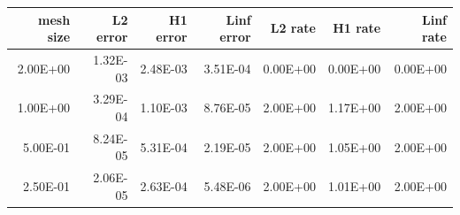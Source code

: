 \begin{tabular}{rrrrrrr}
\toprule
mesh size & L2 error & H1 error & Linf error & L2 rate & H1 rate & Linf rate \\
\midrule
2.00E+00 & 1.32E-03 & 2.48E-03 & 3.51E-04 & 0.00E+00 & 0.00E+00 & 0.00E+00 \\
1.00E+00 & 3.29E-04 & 1.10E-03 & 8.76E-05 & 2.00E+00 & 1.17E+00 & 2.00E+00 \\
5.00E-01 & 8.24E-05 & 5.31E-04 & 2.19E-05 & 2.00E+00 & 1.05E+00 & 2.00E+00 \\
2.50E-01 & 2.06E-05 & 2.63E-04 & 5.48E-06 & 2.00E+00 & 1.01E+00 & 2.00E+00 \\
\bottomrule
\end{tabular}

